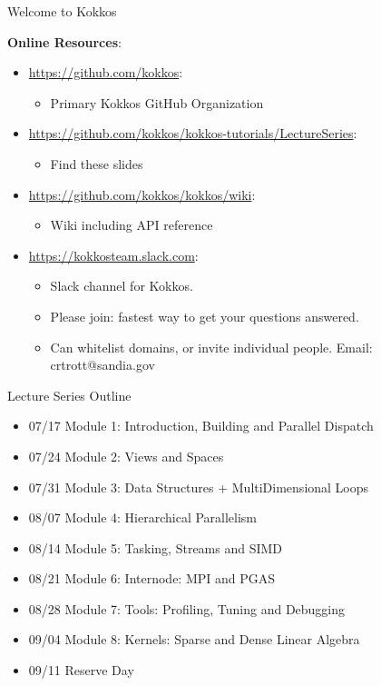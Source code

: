 \begin{frame}{Welcome to Kokkos}

\textbf{Online Resources}:

\begin{itemize}
	\item \url{https://github.com/kokkos}: 
		\begin{itemize}
			\item Primary Kokkos GitHub Organization
		\end{itemize}
	\item \url{https://github.com/kokkos/kokkos-tutorials/LectureSeries}: 
		\begin{itemize}
			\item{Find these slides}
		\end{itemize}
	\item \url{https://github.com/kokkos/kokkos/wiki}: 
		\begin{itemize}
			\item Wiki including API reference
		\end{itemize}
	\item \url{https://kokkosteam.slack.com}: 
		\begin{itemize}
			\item Slack channel for Kokkos.
			\item Please join: fastest way to get your questions answered.
			\item Can whitelist domains, or invite individual people. Email: crtrott@sandia.gov
		\end{itemize}
\end{itemize}

\end{frame}



\begin{frame}{Lecture Series Outline}

\begin{itemize}
	\item 07/17 Module 1: Introduction, Building and Parallel Dispatch 
	\item 07/24 Module 2: Views and Spaces
	\item 07/31 Module 3: Data Structures + MultiDimensional Loops
	\item 08/07 Module 4: Hierarchical Parallelism
	\item 08/14 Module 5: Tasking, Streams and SIMD
	\item 08/21 Module 6: Internode: MPI and PGAS
	\item 08/28 Module 7: Tools: Profiling, Tuning and Debugging
	\item 09/04 Module 8: Kernels: Sparse and Dense Linear Algebra
        \item 09/11 Reserve Day
\end{itemize}
\end{frame}

